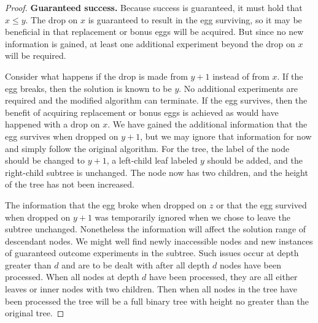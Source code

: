 \documentclass[10pt,a4paper]{amsart}
\begin{document}
\begin{proof}
\medskip
\noindent
\textbf{Guaranteed success.}
Because success is guaranteed, it must hold that $x\leq y$.
The drop on $x$ is guaranteed to result in the egg surviving, 
so it may be  beneficial  in that  replacement or bonus eggs will be acquired. But since
no new information is gained, 
at least one additional experiment beyond the drop on $x$ will be required.  

Consider what happens if  the drop is made from $y+1$ instead of from $x$.
If the egg breaks, then the solution is known to be $y$. No additional 
experiments are required and the modified algorithm can terminate.
If the egg survives, then the benefit of acquiring replacement or bonus 
eggs is achieved as would have happened with a drop on $x$. 
We have gained the additional information that the egg survives when 
dropped on $y+1$, but we may ignore that information for now and 
simply follow the original algorithm.
For the tree, the label of the node should be changed to $y+1$,
a left-child leaf labeled $y$ should be added, and the right-child
subtree is unchanged. The node now has two children, and 
the height of the tree has not been increased. 

\medskip
The information that the egg broke when dropped on $z$
or  that the egg  survived when dropped on $y+1$ was 
temporarily ignored when we chose to leave the  subtree unchanged. Nonetheless
the information will affect the solution range
of descendant nodes.
We might well find newly inaccessible nodes and   new instances of guaranteed outcome
experiments in the   subtree.  Such issues occur at depth greater than $d$
and are to be dealt with after all depth $d$ nodes 
have been processed. When all nodes at depth $d$ have been processed, they are
all either leaves or inner nodes with two children. 
Then when all nodes in the tree have
been processed the tree will be a full binary tree with height no greater than the 
original tree.
\end{proof}
\end{document}
